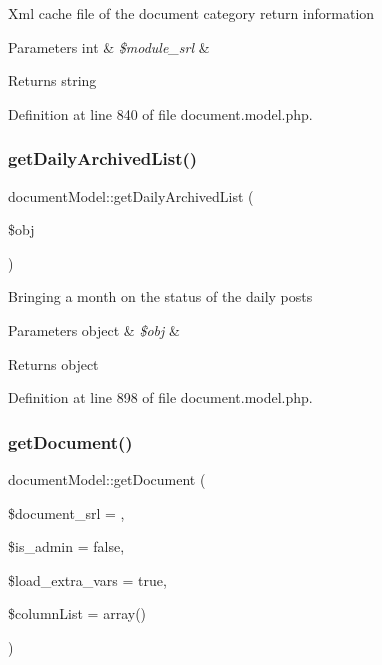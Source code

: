 Xml cache file of the document category return information 
\begin{DoxyParams}[1]{Parameters}
int & {\em \$module\+\_\+srl} & \\
\hline
\end{DoxyParams}
\begin{DoxyReturn}{Returns}
string 
\end{DoxyReturn}


Definition at line 840 of file document.\+model.\+php.

\mbox{\label{classdocumentModel_a9f7ad689da9b5a7b8f75fa2e48aec80a}} 
\subsubsection{\texorpdfstring{get\+Daily\+Archived\+List()}{getDailyArchivedList()}}
{\footnotesize\ttfamily document\+Model\+::get\+Daily\+Archived\+List (\begin{DoxyParamCaption}\item[{}]{\$obj }\end{DoxyParamCaption})}

Bringing a month on the status of the daily posts 
\begin{DoxyParams}[1]{Parameters}
object & {\em \$obj} & \\
\hline
\end{DoxyParams}
\begin{DoxyReturn}{Returns}
object 
\end{DoxyReturn}


Definition at line 898 of file document.\+model.\+php.

\mbox{\label{classdocumentModel_a8846291323aaa3b090e7b8317f8175f2}} 
\subsubsection{\texorpdfstring{get\+Document()}{getDocument()}}
{\footnotesize\ttfamily document\+Model\+::get\+Document (\begin{DoxyParamCaption}\item[{}]{\$document\+\_\+srl = {},  }\item[{}]{\$is\+\_\+admin = {\ttfamily false},  }\item[{}]{\$load\+\_\+extra\+\_\+vars = {\ttfamily true},  }\item[{}]{\$column\+List = {\ttfamily array()} }\end{DoxyParamCaption})}

